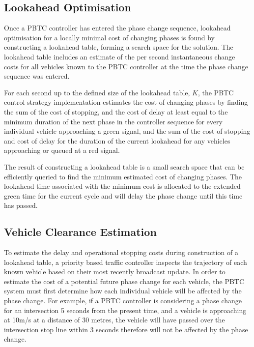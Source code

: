 \subsection{Lookahead Optimisation}

Once a PBTC controller has entered the phase change sequence, lookahead optimisation for a locally minimal cost of changing phases is found by constructing a lookahead table, forming a search space for the solution. The lookahead table includes an estimate of the  per second instantaneous change costs for all vehicles known to the PBTC controller at the time the phase change sequence was entered. 

For each second up to the defined size of the lookahead table, $K$, the PBTC control strategy implementation estimates the cost of changing phases by finding the sum of the cost of stopping, and the cost of delay at least equal to the minimum duration of the next phase in the controller sequence for every individual vehicle approaching a green signal, and the sum of the cost of stopping and cost of delay for the duration of the current lookahead for any vehicles approaching or queued at a red signal. 

The result of constructing a lookahead table is a small search space that can be efficiently queried to find the minimum estimated cost of changing phases. The lookahead time associated with the minimum cost is allocated to the extended green time for the current cycle and will delay the phase change until this time has passed.

\subsection{Vehicle Clearance Estimation}

To estimate the delay and operational stopping costs during construction of a lookahead table, a priority based traffic controller inspects the trajectory of each known vehicle based on their most recently broadcast update. In order to estimate the cost of a potential future phase change for each vehicle, the PBTC system must first determine how each individual vehicle will be affected by the phase change. For example, if a PBTC controller is considering a phase change for an intersection 5 seconds from the present time, and a vehicle is approaching at 10m/s at a distance of 30 metres, the vehicle will have passed over the intersection stop line within 3 seconds therefore will not be affected by the phase change. 

